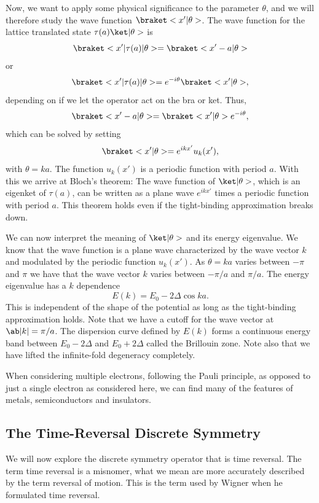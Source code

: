 Now, we want to apply some physical significance to the parameter $\theta$, and we will therefore study the wave function $\bk{x'}{\theta}$. The wave function for the lattice translated state $\tau(a)\k{\theta}$ is 
\begin{equation}
    \bkop{x'}{\tau(a)}{\theta} = \bk{x'-a}{\theta}
\end{equation}
or
\begin{equation}
    \bkop{x'}{\tau(a)}{\theta} = e^{-i\theta}\bk{x'}{\theta},
\end{equation}
depending on if we let the operator act on the bra or ket. Thus,
\begin{equation}
    \bk{x'-a}{\theta} = \bk{x'}{\theta} e^{-i\theta},
\end{equation}
which can be solved by setting
\begin{equation}
    \bk{x'}{\theta} = e^{ikx'}u_k(x'),
\end{equation}
with $\theta=ka$. The function $u_k(x')$ is a periodic function with period $a$. With this we arrive at Bloch's theorem: The wave function of $\k{\theta}$, which is an eigenket of $\tau(a)$, can be written as a plane wave $e^{ikx'}$ times a periodic function with period $a$. This theorem holds even if the tight-binding approximation breaks down.

We can now interpret the meaning of $\k{\theta}$ and its energy eigenvalue. We know that the wave function is a plane wave characterized by the wave vector $k$ and modulated by the periodic function $u_k(x')$. As $\theta = ka$ varies between $-\pi$ and $\pi$ we have that the wave vector $k$ varies between $-\pi/a$ and $\pi/a$. The energy eigenvalue has a $k$ dependence
\begin{equation}
    E(k) = E_0 - 2\Delta \cos ka.
\end{equation}
This is independent of the shape of the potential as long as the tight-binding approximation holds. Note that we have a cutoff for the wave vector at $\abs{k} = \pi/a$. The dispersion curve defined by $E(k)$ forms a continuous energy band between $E_0 - 2\Delta$ and $E_0 + 2\Delta$ called the Brillouin zone. Note also that we have lifted the infinite-fold degeneracy completely.

When considering multiple electrons, following the Pauli principle, as opposed to just a single electron as considered here, we can find many of the features of metals, semiconductors and insulators.

\subsection{The Time-Reversal Discrete Symmetry}
We will now explore the discrete symmetry operator that is time reversal. The term time reversal is a misnomer, what we mean are more accurately described by the term reversal of motion. This is the term used by Wigner when he formulated time reversal.

